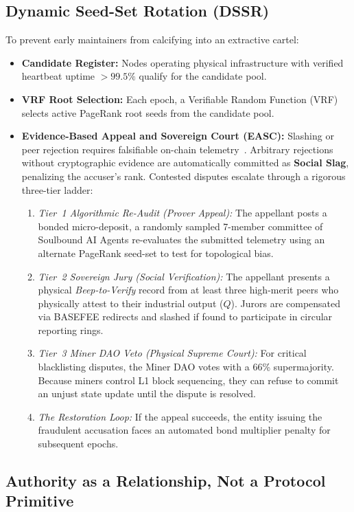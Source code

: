 \documentclass[a4paper,11pt,twoside,parskip=half-,headings=small]{scrartcl}
\begin{document}
\subsection{Dynamic Seed-Set Rotation (DSSR)}

To prevent early maintainers from calcifying into an extractive cartel:
\begin{itemize}
  \item \textbf{Candidate Register:} Nodes operating physical infrastructure with verified
heartbeat uptime $> 99.5\%$ qualify for the candidate pool.
  \item \textbf{VRF Root Selection:} Each epoch, a Verifiable Random Function (VRF) selects
active PageRank root seeds from the candidate pool.
  \item \textbf{Evidence-Based Appeal and Sovereign Court (EASC):} Slashing or peer rejection
requires falsifiable on-chain telemetry~\cite{blum2024lightbook}. Arbitrary rejections without cryptographic evidence are automatically committed as \textbf{Social Slag}, penalizing the accuser's rank. Contested disputes escalate through a rigorous three-tier ladder:
  \begin{enumerate}[label=(\alph*),nosep]
    \item \emph{Tier~1 Algorithmic Re-Audit (Prover Appeal):} The appellant posts a bonded micro-deposit, a randomly sampled 7-member committee of Soulbound AI Agents re-evaluates the submitted telemetry using an alternate PageRank seed-set to test for topological bias.
    \item \emph{Tier~2 Sovereign Jury (Social Verification):} The appellant presents a physical \emph{Beep-to-Verify} record from at least three high-merit peers who physically attest to their industrial output ($Q$). Jurors are compensated via BASEFEE redirects and slashed if found to participate in circular reporting rings.
    \item \emph{Tier~3 Miner DAO Veto (Physical Supreme Court):} For critical blacklisting disputes, the Miner DAO votes with a 66\% supermajority. Because miners control L1 block sequencing, they can refuse to commit an unjust state update until the dispute is resolved.
    \item \emph{The Restoration Loop:} If the appeal succeeds, the entity issuing the fraudulent accusation faces an automated bond multiplier penalty for subsequent epochs.
  \end{enumerate}
\end{itemize}

\subsection{Authority as a Relationship, Not a Protocol Primitive}
\label{sec:relationship_authority}
\end{document}
